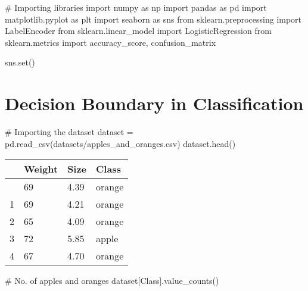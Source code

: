 \documentclass[
  letterpaper,
  DIV=11,
  numbers=noendperiod]{scrreprt}
\newenvironment{Shaded}{\begin{snugshade}}{\end{snugshade}}
\newcommand{\BuiltInTok}[1]{\textcolor[rgb]{0.00,0.23,0.31}{#1}}
\newcommand{\CommentTok}[1]{\textcolor[rgb]{0.37,0.37,0.37}{#1}}
\newcommand{\ImportTok}[1]{\textcolor[rgb]{0.00,0.46,0.62}{#1}}
\newcommand{\NormalTok}[1]{\textcolor[rgb]{0.00,0.23,0.31}{#1}}
\newcommand{\OperatorTok}[1]{\textcolor[rgb]{0.37,0.37,0.37}{#1}}
\newcommand{\StringTok}[1]{\textcolor[rgb]{0.13,0.47,0.30}{#1}}
\begin{document}
\begin{Shaded}
\begin{Highlighting}[]
\CommentTok{\# Importing libraries}
\ImportTok{import}\NormalTok{ numpy }\ImportTok{as}\NormalTok{ np}
\ImportTok{import}\NormalTok{ pandas }\ImportTok{as}\NormalTok{ pd}
\ImportTok{import}\NormalTok{ matplotlib.pyplot }\ImportTok{as}\NormalTok{ plt}
\ImportTok{import}\NormalTok{ seaborn }\ImportTok{as}\NormalTok{ sns}
\ImportTok{from}\NormalTok{ sklearn.preprocessing }\ImportTok{import}\NormalTok{ LabelEncoder}
\ImportTok{from}\NormalTok{ sklearn.linear\_model }\ImportTok{import}\NormalTok{ LogisticRegression}
\ImportTok{from}\NormalTok{ sklearn.metrics }\ImportTok{import}\NormalTok{ accuracy\_score, confusion\_matrix}

\NormalTok{sns.}\BuiltInTok{set}\NormalTok{()}
\end{Highlighting}
\end{Shaded}

\section{Decision Boundary in
Classification}\label{decision-boundary-in-classification}

\begin{Shaded}
\begin{Highlighting}[]
\CommentTok{\# Importing the dataset}
\NormalTok{dataset }\OperatorTok{=}\NormalTok{ pd.read\_csv(}\StringTok{\textquotesingle{}datasets/apples\_and\_oranges.csv\textquotesingle{}}\NormalTok{)}
\NormalTok{dataset.head()}
\end{Highlighting}
\end{Shaded}

\begin{longtable}[]{@{}llll@{}}
\toprule\noalign{}
& Weight & Size & Class \\
\midrule\noalign{}
\endhead
\bottomrule\noalign{}
\endlastfoot
0 & 69 & 4.39 & orange \\
1 & 69 & 4.21 & orange \\
2 & 65 & 4.09 & orange \\
3 & 72 & 5.85 & apple \\
4 & 67 & 4.70 & orange \\
\end{longtable}

\begin{Shaded}
\begin{Highlighting}[]
\CommentTok{\# No. of apples and oranges}
\NormalTok{dataset[}\StringTok{\textquotesingle{}Class\textquotesingle{}}\NormalTok{].value\_counts()}
\end{Highlighting}
\end{Shaded}
\end{document}
